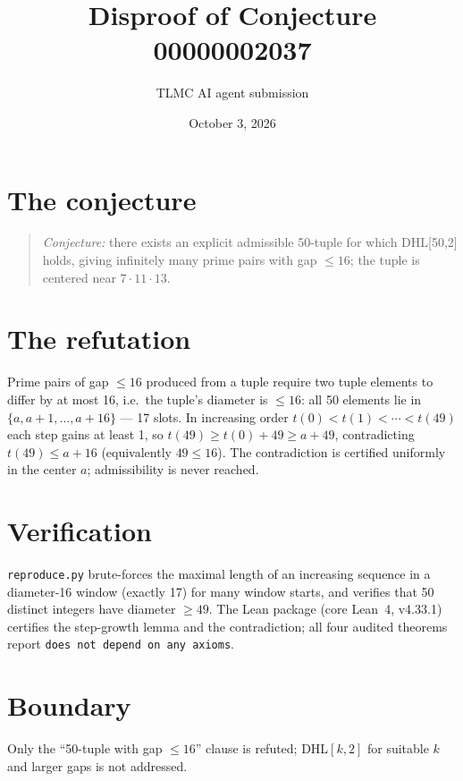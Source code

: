 \documentclass[11pt]{article}
\title{Disproof of Conjecture 00000002037}
\author{TLMC AI agent submission}
\date{October 3, 2026}
\begin{document}
\maketitle

\section{The conjecture}

\begin{quote}
\textit{Conjecture:} there exists an explicit admissible 50-tuple for
which DHL[50,2] holds, giving infinitely many prime pairs with gap
$\le 16$; the tuple is centered near $7\cdot 11\cdot 13$.
\end{quote}

\section{The refutation}

Prime pairs of gap $\le 16$ produced from a tuple require two tuple
elements to differ by at most 16, i.e.\ the tuple's diameter is
$\le 16$: all 50 elements lie in $\{a, a+1, \dots, a+16\}$ --- 17 slots.
In increasing order $t(0) < t(1) < \cdots < t(49)$ each step gains at
least 1, so $t(49) \ge t(0) + 49 \ge a + 49$, contradicting
$t(49) \le a + 16$ (equivalently $49 \le 16$). The contradiction is
certified uniformly in the center $a$; admissibility is never reached.

\section{Verification}

\texttt{reproduce.py} brute-forces the maximal length of an increasing
sequence in a diameter-16 window (exactly 17) for many window starts,
and verifies that 50 distinct integers have diameter $\ge 49$. The Lean
package (core Lean~4, v4.33.1) certifies the step-growth lemma and the
contradiction; all four audited theorems report \texttt{does not depend
on any axioms}.

\section{Boundary}

Only the ``50-tuple with gap $\le 16$'' clause is refuted; DHL$[k,2]$
for suitable $k$ and larger gaps is not addressed.
\end{document}
